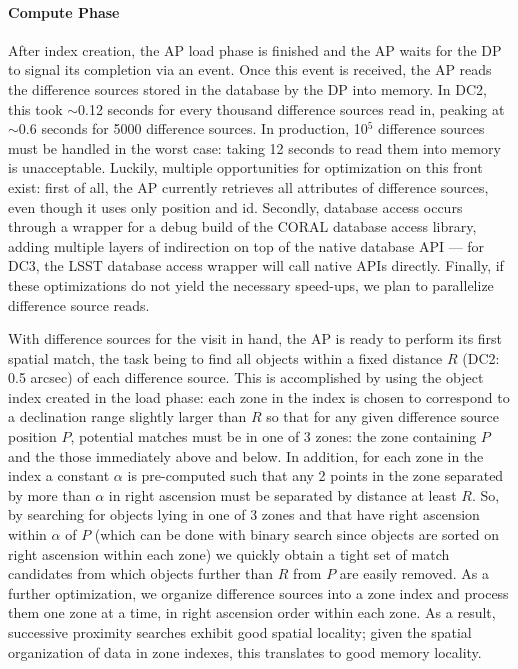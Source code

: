 \paragraph{Compute Phase}

After index creation, the AP load phase is finished and the AP waits for the 
DP to signal its completion via an event. Once this event is received, the AP
reads the difference sources stored in the database by the DP into memory.
In DC2, this took \ensuremath{\sim}0.12 seconds for every thousand difference
sources read in, peaking at \ensuremath{\sim}0.6 seconds for 5000 difference
sources. In production, 10$^{5}$ difference sources must be handled in the worst
case: taking 12 seconds to read them into memory is unacceptable. Luckily,
multiple opportunities for optimization on this front exist: first of all,
the AP currently retrieves all attributes of difference sources, even
though it uses only position and id. Secondly, database access occurs through
a wrapper for a debug build of the CORAL database access library, adding 
multiple layers of indirection on top of the native database API --- for DC3,
the LSST database access wrapper will call native APIs directly. Finally, if
these optimizations do not yield the necessary speed-ups, we plan to
parallelize difference source reads.

With difference sources for the visit in hand, the AP is ready to perform its
first spatial match, the task being to find all objects within a fixed
distance $R$ (DC2: 0.5 arcsec) of each difference source. This is 
accomplished by using the object index created in the load phase: each zone
in the index is chosen to correspond to a declination range slightly larger
than $R$ so that for any given difference source position $P$, potential
matches must be in one of 3 zones: the zone containing $P$ and the those
immediately above and below. In addition, for each zone in the index a
constant $\alpha$ is pre-computed such that any 2 points in the zone separated
by more than $\alpha$ in right ascension must be separated by distance at
least $R$. So, by searching for objects lying in one of 3 zones and that have
right ascension within $\alpha$ of $P$ (which can be done with binary search
since objects are sorted on right ascension within each zone) we quickly
obtain a tight set of match candidates from which objects further than $R$
from $P$ are easily removed. As a further optimization, we organize difference
sources into a zone index and process them one zone at a time, in right
ascension order within each zone. As a result, successive proximity searches
exhibit good spatial locality; given the spatial organization of data in zone
indexes, this translates to good memory locality.

